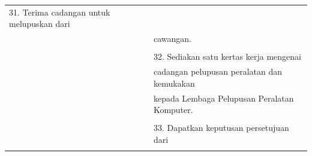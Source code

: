 \documentclass[
]{article}
\begin{document}
\begin{longtable}[]{@{}ll@{}}
\begin{minipage}[t]{0.71\columnwidth}
31. Terima cadangan untuk melupuskan dari\strut
\end{minipage}\tabularnewline
\begin{minipage}[t]{0.23\columnwidth}\raggedright
\strut
\end{minipage} & \begin{minipage}[t]{0.71\columnwidth}\raggedright
cawangan.\strut
\end{minipage}\tabularnewline
\begin{minipage}[t]{0.23\columnwidth}\raggedright
\strut
\end{minipage} & \begin{minipage}[t]{0.71\columnwidth}\raggedright
\strut
\end{minipage}\tabularnewline
\begin{minipage}[t]{0.23\columnwidth}\raggedright
\strut
\end{minipage} & \begin{minipage}[t]{0.71\columnwidth}\raggedright
32. Sediakan satu kertas kerja mengenai\strut
\end{minipage}\tabularnewline
\begin{minipage}[t]{0.23\columnwidth}\raggedright
\strut
\end{minipage} & \begin{minipage}[t]{0.71\columnwidth}\raggedright
cadangan pelupusan peralatan dan kemukakan\strut
\end{minipage}\tabularnewline
\begin{minipage}[t]{0.23\columnwidth}\raggedright
\strut
\end{minipage} & \begin{minipage}[t]{0.71\columnwidth}\raggedright
kepada Lembaga Pelupusan Peralatan Komputer.\strut
\end{minipage}\tabularnewline
\begin{minipage}[t]{0.23\columnwidth}\raggedright
\strut
\end{minipage} & \begin{minipage}[t]{0.71\columnwidth}\raggedright
\strut
\end{minipage}\tabularnewline
\begin{minipage}[t]{0.23\columnwidth}\raggedright
\strut
\end{minipage} & \begin{minipage}[t]{0.71\columnwidth}\raggedright
33. Dapatkan keputusan persetujuan dari\strut
\end{minipage}\tabularnewline
\begin{minipage}[t]{0.23\columnwidth}\raggedright

\end{minipage}
\end{longtable}
\end{document}
